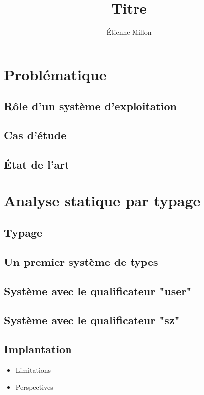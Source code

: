 \documentclass[12pt]{phdthesis}
\title{Titre}
\author{Étienne Millon}
\begin{document}

\tableofcontents


\part{Problématique}

\chapter{Rôle d'un système d'exploitation}



\chapter{Cas d'étude}



\chapter{État de l'art}



\part{Analyse statique par typage}

\chapter{Typage}



\chapter{Un premier système de types}



\chapter{Système avec le qualificateur "user"}



\chapter{Système avec le qualificateur "sz"}

\chapter{Implantation}


\begin{itemize}
  \item Limitations
  \item Perspectives
\end{itemize}




\end{document}
